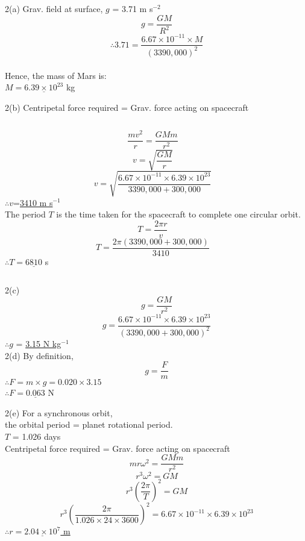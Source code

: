 \documentclass[10pt]{beamer}
\begin{document}
\begin{frame}
2(a) Grav. field at surface, $g$ = 3.71 m s$^{-2}$
\[ g = \frac{GM}{R^2} \] 
\[\therefore 3.71 = \frac{6.67 \times 10^{-11} \times M}{(3390,000)^2} \] \\
Hence, the mass of Mars is:\\
\vspace{10pt}
$M = \underline{6.39 \times 10^{23}}$ kg  \\
\end{frame}

\begin{frame}
2(b) Centripetal force required = Grav. force acting on spacecraft \\
\vspace{10pt}
\begin{columns}
\[ \frac{mv^2}{r}=\frac{GMm}{r^2}    \]
\[v = \sqrt{\frac{GM}{r}}    \]
\[v = \sqrt{\frac{6.67 \times 10^{-11} \times 6.39 \times 10^{23}}{3390,000+300,000}}    \]
$\therefore v$=\underline{3410 m s$^{-1}$ }\\
The period $T$ is the time taken for the spacecraft to complete one circular orbit.\\
\[ T =\frac{2\pi r}{v}   \]
\[ T =\frac{2\pi (3390,000+300,000)}{3410}   \]
$\therefore T = \underline{6810}$ s\\
\end{columns}
\end{frame}

\begin{frame}
2(c)
\[g=\frac{GM}{r^2}   \]
\[g=\frac{6.67 \times 10^{-11} \times 6.39 \times 10^{23}}{(3390,000+300,000)^2}   \]
$\therefore g$ = \underline{3.15 N kg$^{-1}$} \\
\vspace{15pt}
2(d) By definition,\\
\[ g = \frac{F}{m}   \]
$\therefore F = m \times g = 0.020 \times 3.15$\\
\vspace{10pt}
$\therefore F = \underline{0.063} $ N\\

\end{frame}

\begin{frame}
2(e) For a synchronous orbit,\\ the orbital period = planet rotational period.\\
$T$ = 1.026 days\\
Centripetal force required = Grav. force acting on spacecraft \\
\[ mr \omega^2 =\frac{GMm}{r^2}    \]
\[r^3 \omega^2 = GM  \]
\[r^3 \left( \frac{2\pi}{T} \right)^2 = GM    \]
\[r^3 \left( \frac{2\pi}{1.026\times 24 \times 3600} \right)^2 = 6.67 \times 10^{-11} \times 6.39 \times 10^{23} \]
$\therefore r = \underline{2.04 \times 10^7}$\underline{ m}\\
\end{frame}
\end{document}

